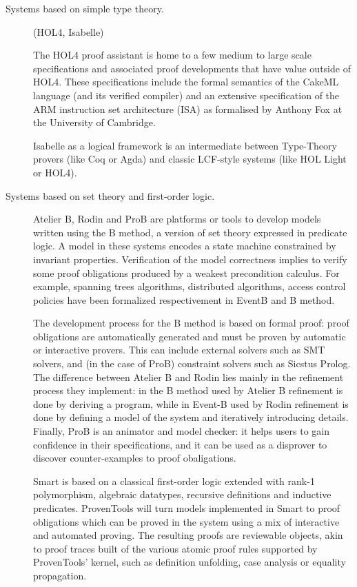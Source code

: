 \begin{description}
  \item[Systems based on simple type theory.] (HOL4, Isabelle)

  The HOL4 proof assistant is home to a few medium to large scale
  specifications and associated proof developments that have value
  outside of HOL4. These specifications include the formal semantics
  of the CakeML language (and its verified compiler) and an extensive
  specification of the ARM instruction set architecture (ISA) as
  formalised by Anthony Fox at the University of Cambridge.

  Isabelle as a logical framework \cite{paulson700} is an intermediate
  between Type-Theory provers (like Coq or Agda) and classic LCF-style
  systems (like HOL Light or HOL4).

\item[Systems based on set theory and first-order logic.] Atelier B,
  Rodin and ProB are platforms or tools to develop models written
  using the B method, a version of set theory expressed in predicate
  logic.  A model in these systems encodes a state machine constrained
  by invariant properties. Verification of the model correctness
  implies to verify some proof obligations produced by a weakest
  precondition calculus. For example, spanning trees algorithms,
  distributed algorithms, access control policies have been formalized
  respectivement in EventB and B method.

  The development process for the B method is based on formal proof:
  proof obligations are automatically generated and must be proven by
  automatic or interactive provers. This can include external solvers
  such as SMT solvers, and (in the case of ProB) constraint solvers
  such as Sicstus Prolog. The difference between Atelier B and Rodin
  lies mainly in the refinement process they implement: in the B
  method used by Atelier B refinement is done by deriving a program,
  while in Event-B used by Rodin refinement is done by defining a
  model of the system and iteratively introducing details. Finally,
  ProB is an animator and model checker: it helps users to gain
  confidence in their specifications, and it can be used as a
  disprover to discover counter-examples to proof obaligations.

  Smart is based on a classical first-order logic extended with rank-1
  polymorphism, algebraic datatypes, recursive definitions and
  inductive predicates. ProvenTools will turn models implemented in
  Smart to proof obligations which can be proved in the system using a
  mix of interactive and automated proving. The resulting proofs are
  reviewable objects, akin to proof traces built of the various atomic
  proof rules supported by ProvenTools' kernel, such as definition
  unfolding, case analysis or equality propagation.
\end{description}
